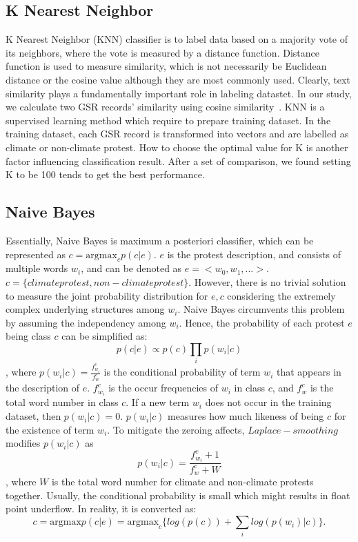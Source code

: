 \subsection{K Nearest Neighbor}
K Nearest Neighbor (KNN) classifier is to label data based on a majority vote of its neighbors, where the vote is measured by a distance function. Distance function is used to measure similarity, which is not necessarily be Euclidean distance or the cosine value although they are most commonly used. Clearly, text similarity plays a fundamentally important role in labeling datastet. In our study, we calculate two GSR records' similarity using cosine similarity~\cite{manning2008introduction}. KNN is a supervised learning method which require to prepare training dataset. In the training dataset, each GSR record is transformed into vectors and are labelled as climate or non-climate protest. How to choose the optimal value for K is another factor influencing classification result. After a set of comparison, we found setting K to be 100 tends to get the best performance.


\subsection{Naive Bayes}
Essentially, Naive Bayes is maximum a posteriori classifier, which can be represented as $c = \mathrm{argmax}_c{p(c|e)}$. $e$ is the protest description, and consists of multiple words $w_i$, and can be denoted as $e=<w_0, w_1,...>$. $c=\{climate protest, non-climate protest\}$. However, there is no trivial solution to measure the joint probability distribution for $e,c$ considering the extremely complex underlying structures among $w_i$. Naive Bayes circumvents this problem by assuming the independency among $w_i$. Hence, the probability of each protest $e$ being class $c$ can be simplified as: $$p(c|e)\propto p(c)\prod_i p(w_i|c)$$, where $p(w_i|c)=\frac{f_{w_i}^c}{f_{w}^c}$ is the conditional probability of term $w_i$ that appears in the description of $e$. $f_{w_i}^c$ is the occur frequencies of $w_i$ in class $c$, and $f_{w}^c$ is the total word number in class $c$.  If a new term $w_i$ does not occur in the training dataset, then $p(w_i|c) = 0$. $p(w_i|c)$ measures how much likeness of being $c$ for the existence of term $w_i$. To mitigate the zeroing affects, $Laplace-smoothing$ modifies $p(w_i|c)$ as $$p(w_i|c)=\frac{f_{w_i}^c+1}{f_{w}^c+W}$$, where $W$ is the total word number for climate and non-climate protests together. Usually, the conditional probability is small which might results in float point underflow. In reality, it is converted as: $$c = \mathrm{argmax}{p(c|e)}=\mathrm{argmax}_c\{log(p(c)) + \sum_ilog(p(w_i)|c)\}.$$


